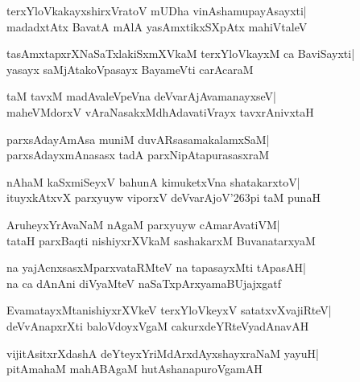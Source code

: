 \documentclass[twoside,12pt,openright]{book}
\def\S{\char'263}
\newcounter{shloka}[chapter]
\begin{document}
\begin{shloka}%
terxYloVkakayxshirxVratoV mUDha vinAshamupayAsayxti|\\
madadxtAtx BavatA mAlA yasAmxtikxSXpAtx mahiVtaleV
\end{shloka}

\begin{shloka}%
tasAmxtapxrXNaSaTxlakiSxmXVkaM terxYloVkayxM ca BaviSayxti|\\
yasayx saMjAtakoVpasayx BayameVti carAcaraM
\end{shloka}

\begin{shloka}%
taM tavxM madAvaleVpeVna deVvarAjAvamanayxseV|\\
maheVMdorxV vAraNasakxMdhAdavatiVrayx tavxrAnivxtaH
\end{shloka}

\begin{shloka}%
parxsAdayAmAsa muniM duvARsasamakalamxSaM|\\
parxsAdayxmAnasasx tadA parxNipAtapurasasxraM
\end{shloka}

\begin{shloka}%
nAhaM kaSxmiSeyxV bahunA kimuketxVna shatakarxtoV|\\
ituyxkAtxvX parxyuyw viporxV deVvarAjoV\S pi taM punaH
\end{shloka}

\begin{shloka}%
AruheyxYrAvaNaM nAgaM parxyuyw cAmarAvatiVM|\\
tataH parxBaqti nishiyxrXVkaM sashakarxM  BuvanatarxyaM
\end{shloka}

\begin{shloka}%
na yajAcnxsasxMparxvataRMteV na tapasayxMti tApasAH|\\
na ca dAnAni diVyaMteV naSaTxpArxyamaBUjajxgatf
\end{shloka}

\begin{shloka}%
EvamatayxMtanishiyxrXVkeV terxYloVkeyxV satatxvXvajiRteV|\\
deVvAnapxrXti baloVdoyxVgaM cakurxdeYRteVyadAnavAH
\end{shloka}

\begin{shloka}%
vijitAsitxrXdashA deYteyxYriMdArxdAyxshayxraNaM yayuH|\\
pitAmahaM mahABAgaM hutAshanapuroVgamAH
\end{shloka}
\end{document}
